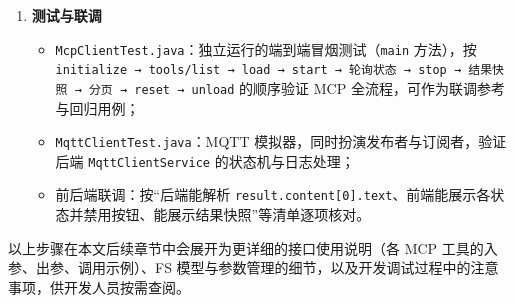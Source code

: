 \begin{enumerate}[label=\arabic*)]
\begin{itemize}
		\item 步进播放/回退：调用 \texttt{getRemoteSimulationEvents} 按 10 秒窗口（\texttt{duration=10000}）获取仿真事件（对象进入/离开工站等）；步进播放时光标后移 10 秒（\texttt{timeWindowCursor += 10000}），步进回退时光标前移 10 秒；
		\item 实时事件订阅（\texttt{events} 驱动）：前端先调用 \texttt{setEventPublishing}（\texttt{enabled=true, publishIntervalMs=500}）让 FS 开始发布事件，再自建 MQTT 连接订阅 \texttt{factory/sim/\{username\}/\{modelId\}/events}，将接收到的消息保存到 store（\texttt{myModel.events}），最多保存 100 条用于分析，之后不再保存；收到消息时按 \texttt{runId} 过滤，只保留当前运行的事件；"停止实时订阅"时调用 \texttt{setEventPublishing}（\texttt{enabled=false}）让 FS 停止发布，并断开 MQTT 连接；
		\item \bf{说明}：demo 不使用 \texttt{animation/\{layerId\}/objects} 主题——模型较大时该主题数据量比 JPEG 图片流还大，改为 \texttt{events} 事件驱动订阅，配合对象位置快照查询即可支撑数字孪生渲染。
	\end{itemize}
	\item \bf{测试与联调}\label{sec:brief-step10}
	\begin{itemize}
		\item \texttt{McpClientTest.java}：独立运行的端到端冒烟测试（\texttt{main} 方法），按 \texttt{initialize → tools/list → load → start → 轮询状态 → stop → 结果快照 → 分页 → reset → unload} 的顺序验证 MCP 全流程，可作为联调参考与回归用例；
		\item \texttt{MqttClientTest.java}：MQTT 模拟器，同时扮演发布者与订阅者，验证后端 \texttt{MqttClientService} 的状态机与日志处理；
		\item 前后端联调：按“后端能解析 \texttt{result.content[0].text}、前端能展示各状态并禁用按钮、能展示结果快照”等清单逐项核对。
	\end{itemize}
\end{enumerate}

\par 以上步骤在本文后续章节中会展开为更详细的接口使用说明（各 MCP 工具的入参、出参、调用示例）、FS 模型与参数管理的细节，以及开发调试过程中的注意事项，供开发人员按需查阅。
